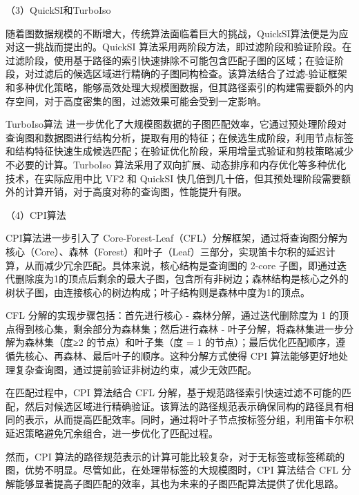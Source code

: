 （3）QuickSI和TurboIso

随着图数据规模的不断增大，传统算法面临着巨大的挑战，QuickSI算法\cite{sm-quicksi-shang2008taming}便是为应对这一挑战而提出的。QuickSI 算法采用两阶段方法，即过滤阶段和验证阶段。在过滤阶段，使用基于路径的索引快速排除不可能包含匹配子图的区域；在验证阶段，对过滤后的候选区域进行精确的子图同构检查。该算法结合了过滤-验证框架和多种优化策略，能够高效处理大规模图数据，但其路径索引的构建需要额外的内存空间，对于高度密集的图，过滤效果可能会受到一定影响。

TurboIso算法\cite{sm-turbo-iso-DBLP:conf/sigmod/HanLL13} 进一步优化了大规模图数据的子图匹配效率，它通过预处理阶段对查询图和数据图进行结构分析，提取有用的特征；在候选生成阶段，利用节点标签和结构特征快速生成候选匹配；在验证优化阶段，采用增量式验证和剪枝策略减少不必要的计算。TurboIso 算法采用了双向扩展、动态排序和内存优化等多种优化技术，在实际应用中比 VF2 和 QuickSI 快几倍到几十倍，但其预处理阶段需要额外的计算开销，对于高度对称的查询图，性能提升有限。

（4）CPI算法

CPI\cite{sm-CPI-bi2016efficient}算法进一步引入了 Core-Forest-Leaf（CFL）分解框架，通过将查询图分解为核心（Core）、森林（Forest）和叶子（Leaf）三部分，实现笛卡尔积的延迟计算，从而减少冗余匹配。具体来说，核心结构是查询图的 2-core 子图，即通过迭代删除度为1的顶点后剩余的最大子图，包含所有非树边；森林结构是核心之外的树状子图，由连接核心的树边构成；叶子结构则是森林中度为1的顶点。

CFL 分解的实现步骤包括：首先进行核心 - 森林分解，通过迭代删除度为 1 的顶点得到核心集，剩余部分为森林集；然后进行森林 - 叶子分解，将森林集进一步分解为森林集（度≥2 的节点）和叶子集（度 = 1 的节点）；最后优化匹配顺序，遵循先核心、再森林、最后叶子的顺序。这种分解方式使得 CPI 算法能够更好地处理复杂查询图，通过提前验证非树边约束，减少无效匹配。

在匹配过程中，CPI 算法结合 CFL 分解，基于规范路径索引快速过滤不可能的匹配，然后对候选区域进行精确验证。该算法的路径规范表示确保同构的路径具有相同的表示，从而提高匹配效率。同时，通过将叶子节点按标签分组，利用笛卡尔积延迟策略避免冗余组合，进一步优化了匹配过程。

然而，CPI 算法的路径规范表示的计算可能比较复杂，对于无标签或标签稀疏的图，优势不明显。尽管如此，在处理带标签的大规模图时，CPI 算法结合 CFL 分解能够显著提高子图匹配的效率，其也为未来的子图匹配算法提供了优化思路。

